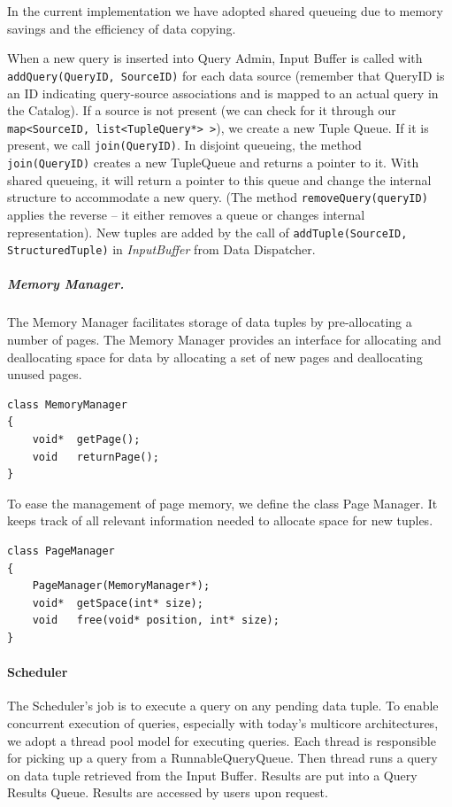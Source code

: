 \documentclass[14pt]{article}
\begin{document}
In the current implementation we have adopted shared queueing due to memory
savings and the efficiency of data copying.

When a new query is inserted into Query Admin, Input Buffer is called with {\tt
addQuery(QueryID, SourceID)} for each data source (remember that QueryID is an
ID indicating query-source associations and is mapped to an actual query in the
Catalog). If a source is not present (we can check for it through our {\tt
map<SourceID, list<TupleQuery*> >}), we create a new Tuple Queue. If it is
present, we call {\tt join(QueryID)}. In disjoint queueing, the method {\tt
join(QueryID)} creates a new TupleQueue and returns a pointer to it. With shared
queueing, it will return a pointer to this queue and change the internal
structure to accommodate a new query. (The method {\tt removeQuery(queryID)}
applies the reverse -- it either removes a queue or changes internal
representation). New tuples are added by the call of {\tt addTuple(SourceID,
StructuredTuple)} in \emph{InputBuffer} from Data Dispatcher.

\subparagraph{Memory Manager.} The Memory Manager facilitates storage of data
tuples by pre-allocating a number of pages. The Memory Manager provides an
interface for allocating and deallocating space for data by allocating a set of
new pages and deallocating unused pages.

\begin{Verbatim}
class MemoryManager
{
    void*  getPage();
    void   returnPage();
}
\end{Verbatim}

\noindent To ease the management of page memory, we define the class Page
Manager. It keeps track of all relevant information needed to allocate space for
new tuples.

\begin{Verbatim}
class PageManager
{
    PageManager(MemoryManager*);
    void*  getSpace(int* size);
    void   free(void* position, int* size);
}
\end{Verbatim}

\paragraph{Scheduler}

The Scheduler's job is to execute a query on any pending data tuple. To enable
concurrent execution of queries, especially with today's multicore
architectures, we adopt a thread pool model for executing queries. Each thread
is responsible for picking up a query from a RunnableQueryQueue. Then thread
runs a query on data tuple retrieved from the Input Buffer. Results are put into
a Query Results Queue. Results are accessed by users upon request.
\end{document}
